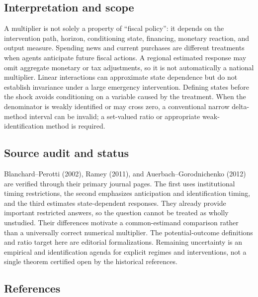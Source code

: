 \documentclass[11pt,a4paper]{article}
\begin{document}
\subsection*{Interpretation and scope}

A multiplier is not solely a property of ``fiscal policy'': it depends on the intervention path, horizon, conditioning state, financing, monetary reaction, and output measure. Spending news and current purchases are different treatments when agents anticipate future fiscal actions. A regional estimated response may omit aggregate monetary or tax adjustments, so it is not automatically a national multiplier. Linear interactions can approximate state dependence but do not establish invariance under a large emergency intervention. Defining states before the shock avoids conditioning on a variable caused by the treatment. When the denominator is weakly identified or may cross zero, a conventional narrow delta-method interval can be invalid; a set-valued ratio or appropriate weak-identification method is required.

\subsection*{Source audit and status}

Blanchard--Perotti (2002), Ramey (2011), and Auerbach--Gorodnichenko (2012) are verified through their primary journal pages. The first uses institutional timing restrictions, the second emphasizes anticipation and identification timing, and the third estimates state-dependent responses. They already provide important restricted answers, so the question cannot be treated as wholly unstudied. Their differences motivate a common-estimand comparison rather than a universally correct numerical multiplier. The potential-outcome definitions and ratio target here are editorial formalizations. Remaining uncertainty is an empirical and identification agenda for explicit regimes and interventions, not a single theorem certified open by the historical references.

\subsection*{References}
\end{document}

